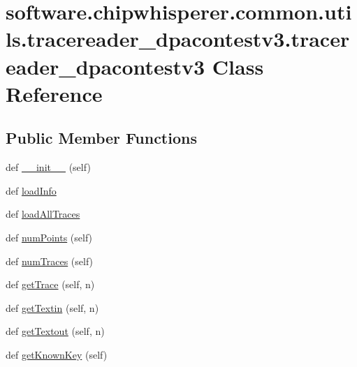 \hypertarget{classsoftware_1_1chipwhisperer_1_1common_1_1utils_1_1tracereader__dpacontestv3_1_1tracereader__dpacontestv3}{}\section{software.\+chipwhisperer.\+common.\+utils.\+tracereader\+\_\+dpacontestv3.\+tracereader\+\_\+dpacontestv3 Class Reference}
\label{classsoftware_1_1chipwhisperer_1_1common_1_1utils_1_1tracereader__dpacontestv3_1_1tracereader__dpacontestv3}
\subsection*{Public Member Functions}
\begin{DoxyCompactItemize}
\item 
def \hyperlink{classsoftware_1_1chipwhisperer_1_1common_1_1utils_1_1tracereader__dpacontestv3_1_1tracereader__dpacontestv3_a42095b5e2eb802683c089e041c2e085c}{\+\_\+\+\_\+init\+\_\+\+\_\+} (self)
\item 
def \hyperlink{classsoftware_1_1chipwhisperer_1_1common_1_1utils_1_1tracereader__dpacontestv3_1_1tracereader__dpacontestv3_aeffb5edf11369803be2b01672636f7e5}{load\+Info}
\item 
def \hyperlink{classsoftware_1_1chipwhisperer_1_1common_1_1utils_1_1tracereader__dpacontestv3_1_1tracereader__dpacontestv3_a1b99be03301e781533bff35383bc100c}{load\+All\+Traces}
\item 
def \hyperlink{classsoftware_1_1chipwhisperer_1_1common_1_1utils_1_1tracereader__dpacontestv3_1_1tracereader__dpacontestv3_a11b97a8254488166580b45e6c04508fe}{num\+Points} (self)
\item 
def \hyperlink{classsoftware_1_1chipwhisperer_1_1common_1_1utils_1_1tracereader__dpacontestv3_1_1tracereader__dpacontestv3_ae96ac42e85bbd26506f18a40602c339d}{num\+Traces} (self)
\item 
def \hyperlink{classsoftware_1_1chipwhisperer_1_1common_1_1utils_1_1tracereader__dpacontestv3_1_1tracereader__dpacontestv3_ad247fcbceb575bc0bcc5d3c566b39120}{get\+Trace} (self, n)
\item 
def \hyperlink{classsoftware_1_1chipwhisperer_1_1common_1_1utils_1_1tracereader__dpacontestv3_1_1tracereader__dpacontestv3_a7e4d39ad6728aef9acdcbd7768416918}{get\+Textin} (self, n)
\item 
def \hyperlink{classsoftware_1_1chipwhisperer_1_1common_1_1utils_1_1tracereader__dpacontestv3_1_1tracereader__dpacontestv3_aed660da6502dea2996a9a871e44fa76d}{get\+Textout} (self, n)
\item 
def \hyperlink{classsoftware_1_1chipwhisperer_1_1common_1_1utils_1_1tracereader__dpacontestv3_1_1tracereader__dpacontestv3_a6686e25be40a2c8dd114a5b0aa8dd71c}{get\+Known\+Key} (self)
\end{DoxyCompactItemize}
